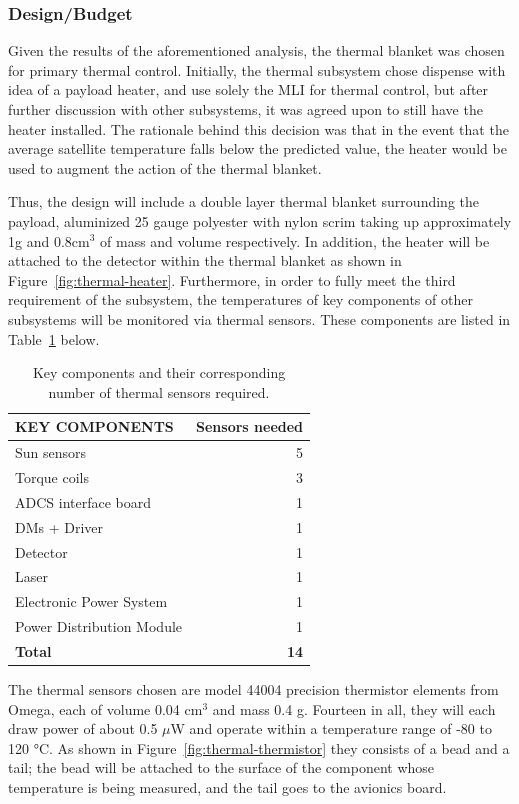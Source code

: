 \documentclass[12pt]{article}
\begin{document}
\subsubsection{Design/Budget}

Given the results of the aforementioned analysis, the thermal blanket was chosen for primary thermal control. Initially, the thermal subsystem chose dispense with idea of a payload heater, and use solely the MLI for thermal control, but after further discussion with other subsystems, it was agreed upon to still have the heater installed. The rationale behind this decision was that in the event that the average satellite temperature falls below the predicted value, the heater would be used to augment the action of the thermal blanket.
 
Thus, the design will include a double layer thermal blanket surrounding the payload, aluminized 25 gauge polyester with nylon scrim taking up approximately 1g and 0.8cm$^3$ of mass and volume respectively. In addition, the heater will be attached to the detector within the thermal blanket as shown in Figure~\ref{fig:thermal-heater}.  Furthermore, in order to fully meet the third requirement of the subsystem, the temperatures of key components of other subsystems will be monitored via thermal sensors.  These components are listed in Table~\ref{table:thermal-sensors} below.

\begin{table}[ht]%
\centering
\caption{Key components and their corresponding number of thermal sensors required.}
\label{table:thermal-sensors}
\begin{tabular}{|l|r|}\hline
\textbf{KEY COMPONENTS} & \textbf{Sensors needed} \\\hline
Sun sensors & 5 \\\hline
Torque coils & 3 \\\hline
ADCS interface board & 1 \\\hline
DMs + Driver & 1 \\\hline
Detector & 1 \\\hline
Laser & 1 \\\hline
Electronic Power System & 1 \\\hline
Power Distribution Module & 1 \\\hline
\textbf{Total} & \textbf{14} \\\hline
\end{tabular}
\end{table}

The thermal sensors chosen are model 44004 precision thermistor elements from Omega, each of volume 0.04 cm$^3$ and mass 0.4 g. Fourteen in all, they will each draw power of about 0.5 $\mu$W and operate within a temperature range of -80 to 120 °C. As shown in Figure~\ref{fig:thermal-thermistor} they consists of a bead and a tail; the bead will be attached to the surface of the component whose temperature is being measured, and the tail goes to the avionics board.
\end{document}
